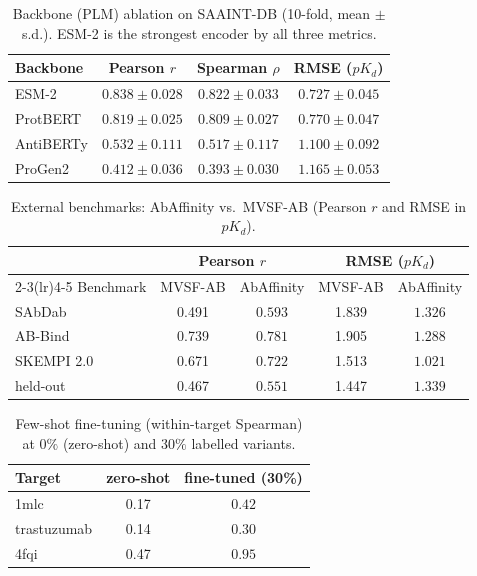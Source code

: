 \documentclass{article}
\newcommand{\pkd}{\ensuremath{pK_d}}
\begin{document}
\begin{table}[h]\centering
\caption{Backbone (PLM) ablation on SAAINT-DB (10-fold, mean $\pm$ s.d.). ESM-2 is the strongest encoder
by all three metrics.}
\begin{tabular}{lccc}
\toprule
Backbone & Pearson $r$ & Spearman $\rho$ & RMSE (\pkd{})\\
\midrule
ESM-2      & $\mathbf{0.838\pm0.028}$ & $\mathbf{0.822\pm0.033}$ & $\mathbf{0.727\pm0.045}$\\
ProtBERT   & $0.819\pm0.025$ & $0.809\pm0.027$ & $0.770\pm0.047$\\
AntiBERTy  & $0.532\pm0.111$ & $0.517\pm0.117$ & $1.100\pm0.092$\\
ProGen2    & $0.412\pm0.036$ & $0.393\pm0.030$ & $1.165\pm0.053$\\
\bottomrule
\end{tabular}
\end{table}

\begin{table}[h]\centering
\caption{External benchmarks: AbAffinity vs.\ MVSF-AB (Pearson $r$ and RMSE in \pkd{}).}
\begin{tabular}{lcccc}
\toprule
& \multicolumn{2}{c}{Pearson $r$} & \multicolumn{2}{c}{RMSE (\pkd{})}\\
\cmidrule(lr){2-3}\cmidrule(lr){4-5}
Benchmark & MVSF-AB & AbAffinity & MVSF-AB & AbAffinity\\
\midrule
SAbDab       & 0.491 & $\mathbf{0.593}$ & 1.839 & $\mathbf{1.326}$\\
AB-Bind      & 0.739 & $\mathbf{0.781}$ & 1.905 & $\mathbf{1.288}$\\
SKEMPI 2.0   & 0.671 & $\mathbf{0.722}$ & 1.513 & $\mathbf{1.021}$\\
held-out     & 0.467 & $\mathbf{0.551}$ & 1.447 & $\mathbf{1.339}$\\
\bottomrule
\end{tabular}
\end{table}

\begin{table}[h]\centering
\caption{Few-shot fine-tuning (within-target Spearman) at $0\%$ (zero-shot) and $30\%$ labelled variants.}
\begin{tabular}{lcc}
\toprule
Target & zero-shot & fine-tuned (30\%)\\
\midrule
1mlc         & 0.17 & $\mathbf{0.42}$\\
trastuzumab  & 0.14 & $\mathbf{0.30}$\\
4fqi         & 0.47 & $\mathbf{0.95}$\\
\bottomrule
\end{tabular}
\end{table}
\end{document}
